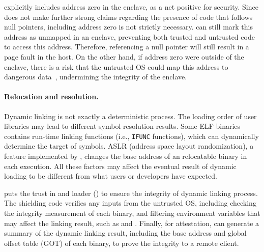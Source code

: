 \graphenesgx{} explicitly includes address zero in the enclave, as a net positive for security.
Since \graphenesgx{} does not make further strong claims regarding  the presence of code that follows null pointers,
including address zero
is not strictly necessary.
\graphenesgx{} can still mark this address as unmapped in an enclave, preventing both trusted and untrusted code
to access this address.
Therefore, referencing a null pointer will still result in a page fault in the host.
On the other hand, if address zero were outside of the enclave,
there is a risk that the untrusted OS could map this address to dangerous data~\cite{cve-2009-2692},
undermining the integrity of the enclave.
 
 

 

\paragraph{Relocation and resolution.}
Dynamic linking is not exactly a deterministic process. The loading order of user libraries
may lead to different symbol resolution results.
Some ELF binaries contains run-time linking functions (i.e., {\tt IFUNC} functions), which can dynamically determine
the target of symbols.
ASLR (address space layout randomization),
a feature implemented by \thelibos{},
changes the base address of an relocatable binary
in each execution.
All these factors may affect the eventual result of dynamic loading to be different from what users or developers have expected.


\graphenesgx{} puts the trust in \thelibos{} and \glibc{} loader () to ensure
the integrity of dynamic linking process.
The shielding code
verifies any inputs from the untrusted OS,
including
checking the integrity measurement
of each binary, and
filtering environment variables that may affect the linking result, such as  and
.
Finally, for attestation,
\graphenesgx{} can generate a summary of the dynamic linking result,
including the base address and global offset table (GOT) of each binary,
to prove the integrity to a remote client.


